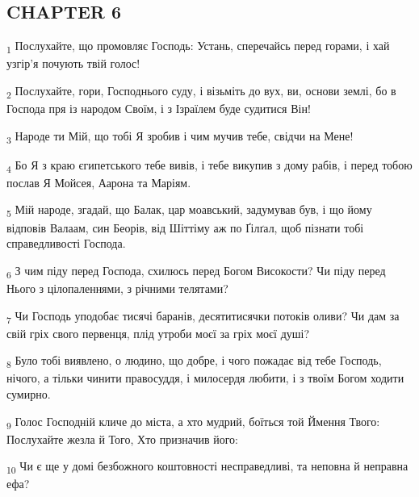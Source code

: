 \subsection{CHAPTER 6}
\begin{tcolorbox}
\textsubscript{1} Послухайте, що промовляє Господь: Устань, сперечайсь перед горами, і хай узгір'я почують твій голос!
\end{tcolorbox}
\begin{tcolorbox}
\textsubscript{2} Послухайте, гори, Господнього суду, і візьміть до вух, ви, основи землі, бо в Господа пря із народом Своїм, і з Ізраїлем буде судитися Він!
\end{tcolorbox}
\begin{tcolorbox}
\textsubscript{3} Народе ти Мій, що тобі Я зробив і чим мучив тебе, свідчи на Мене!
\end{tcolorbox}
\begin{tcolorbox}
\textsubscript{4} Бо Я з краю єгипетського тебе вивів, і тебе викупив з дому рабів, і перед тобою послав Я Мойсея, Аарона та Маріям.
\end{tcolorbox}
\begin{tcolorbox}
\textsubscript{5} Мій народе, згадай, що Балак, цар моавський, задумував був, і що йому відповів Валаам, син Беорів, від Шіттіму аж по Ґілґал, щоб пізнати тобі справедливості Господа.
\end{tcolorbox}
\begin{tcolorbox}
\textsubscript{6} З чим піду перед Господа, схилюсь перед Богом Високости? Чи піду перед Нього з цілопаленнями, з річними телятами?
\end{tcolorbox}
\begin{tcolorbox}
\textsubscript{7} Чи Господь уподобає тисячі баранів, десятитисячки потоків оливи? Чи дам за свій гріх свого первенця, плід утроби моєї за гріх моєї душі?
\end{tcolorbox}
\begin{tcolorbox}
\textsubscript{8} Було тобі виявлено, о людино, що добре, і чого пожадає від тебе Господь, нічого, а тільки чинити правосуддя, і милосердя любити, і з твоїм Богом ходити сумирно.
\end{tcolorbox}
\begin{tcolorbox}
\textsubscript{9} Голос Господній кличе до міста, а хто мудрий, боїться той Ймення Твого: Послухайте жезла й Того, Хто призначив його:
\end{tcolorbox}
\begin{tcolorbox}
\textsubscript{10} Чи є ще у домі безбожного коштовності несправедливі, та неповна й неправна ефа?
\end{tcolorbox}
